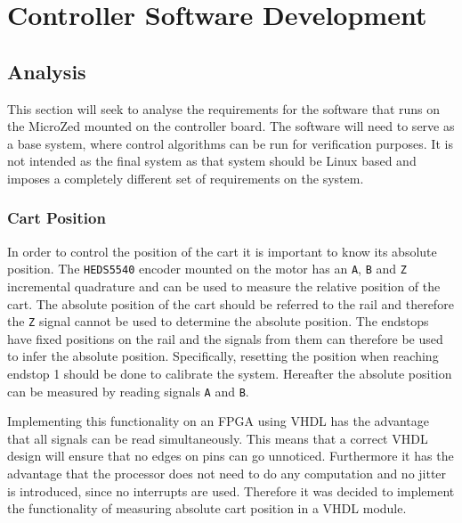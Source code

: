 \section{Controller Software Development} %
\label{sub:controller_board_software}

\subsection{Analysis} %
\label{sub:analysis}
This section will seek to analyse the requirements for the software that runs on the MicroZed mounted on the controller board.
The software will need to serve as a base system, where control algorithms can be run for verification purposes.
It is not intended as the final system as that system should be Linux based and imposes a completely different set of requirements on the system.

\subsubsection{Cart Position} 
\label{ssub:cart_position}
In order to control the position of the cart it is important to know its absolute position.
The \texttt{HEDS5540} \cite{heds5540} encoder mounted on the motor has an \texttt{A}, \texttt{B} and \texttt{Z} incremental quadrature and can be used to measure the relative position of the cart. 
The absolute position of the cart should be referred to the rail and therefore the \texttt{Z} signal cannot be used to determine the absolute position.
The endstops have fixed positions on the rail and the signals from them can therefore be used to infer the absolute position.
Specifically, resetting the position when reaching endstop 1 should be done to calibrate the system.
Hereafter the absolute position can be measured by reading signals \texttt{A} and \texttt{B}.

Implementing this functionality on an FPGA using VHDL has the advantage that all signals can be read simultaneously.
This means that a correct VHDL design will ensure that no edges on pins can go unnoticed.
Furthermore it has the advantage that the processor does not need to do any computation and no jitter is introduced, since no interrupts are used. 
Therefore it was decided to implement the functionality of measuring absolute cart position in a VHDL module.


